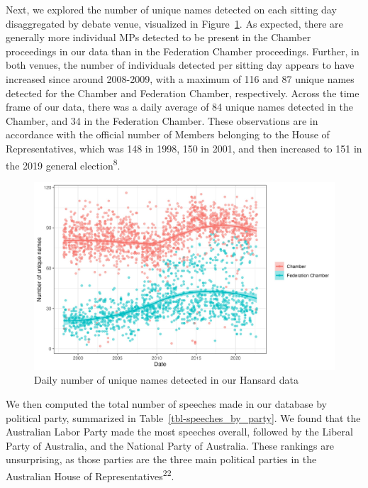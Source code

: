 \documentclass[
  letterpaper,
  DIV=11,
  numbers=noendperiod]{scrartcl}
\begin{document}
Next, we explored the number of unique names detected on each sitting
day disaggregated by debate venue, visualized in Figure~\ref{fig-names}.
As expected, there are generally more individual MPs detected to be
present in the Chamber proceedings in our data than in the Federation
Chamber proceedings. Further, in both venues, the number of individuals
detected per sitting day appears to have increased since around
2008-2009, with a maximum of 116 and 87 unique names detected for the
Chamber and Federation Chamber, respectively. Across the time frame of
our data, there was a daily average of 84 unique names detected in the
Chamber, and 34 in the Federation Chamber. These observations are in
accordance with the official number of Members belonging to the House of
Representatives, which was 148 in 1998, 150 in 2001, and then increased
to 151 in the 2019 general election\textsuperscript{8}.

\begin{figure}

{\centering \includegraphics[width=4.58333in,height=\textheight]{n_unique_names.jpg}

}

\caption{\label{fig-names}Daily number of unique names detected in our
Hansard data}

\end{figure}

We then computed the total number of speeches made in our database by
political party, summarized in Table~\ref{tbl-speeches_by_party}. We
found that the Australian Labor Party made the most speeches overall,
followed by the Liberal Party of Australia, and the National Party of
Australia. These rankings are unsurprising, as those parties are the
three main political parties in the Australian House of
Representatives\textsuperscript{22}.
\end{document}
